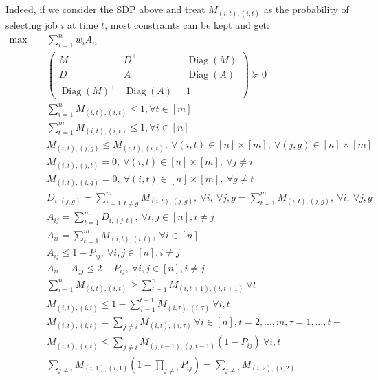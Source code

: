 \documentclass{article}
\newcommand{\Diag}{\operatorname{Diag}}
\begin{document}
Indeed, if we consider the SDP above and treat $M_{(i,t),(i,t)}$ as the probability of selecting job $i$ at time $t$, most constraints can be kept and get:
\begin{align*}
    \max\quad~&\sum_{i=1}^{n}w_iA_{ii}\\
    &\begin{pmatrix}
        M & D^\top &\Diag(M)\\
        D & A &\Diag(A)\\
        \Diag(M)^\top &\Diag(A)^\top &1
    \end{pmatrix}\succeq 0\\
    &\sum_{i=1}^{n}M_{(i,t),(i,t)} \leq 1,\forall t\in[m]\\
    &\sum_{t=1}^{m}M_{(i,t),(i,t)} \leq 1,\forall i\in[n]\\
    &M_{(i,t),(j,g)}\leq M_{(i,t),(i,t)},~\forall (i,t)\in [n]\times [m],~\forall (j,g)\in [n]\times [m]\\
    &M_{(i,t),(j,t)}=0,~\forall (i,t)\in [n]\times [m],~\forall j\neq i\\
    &M_{(i,t),(i,g)}=0,~\forall (i,t)\in [n]\times [m],~\forall g\neq t\\
    &D_{i,(j,g)} = \sum_{t=1,t\neq g}^{m}M_{(i,t),(j,g)},~\forall i,~\forall j,g = \sum_{t=1}^{m}M_{(i,t),(j,g)},~\forall i,~\forall j,g\\
    &A_{ij}=\sum_{t=1}^{m}D_{i,(j,t)},~\forall i,j\in [n], i\neq j\\
    &A_{ii}=\sum_{t=1}^{m}M_{(i,t),(i,t)},~\forall i\in[n]\\
    &A_{ij}\leq 1-P_{ij},~\forall i,j\in [n], i\neq j\\
    &A_{ii}+A_{jj}\leq 2-P_{ij},~\forall i,j\in [n], i\neq j\\
    &\sum_{i=1}^{n}M_{(i,t),(i,t)}\geq\sum_{i=1}^{n}M_{(i,t+1),(i,t+1)}~\forall t\\
    & M_{(i,t),(i,t)}\leq 1-\sum_{\tau = 1}^{t-1}M_{(i,\tau),(i,\tau)}~\forall i,t\\
    &M_{(i,t),(i,t)} = \sum_{j\neq i}M_{(i,t),(i,\tau)}~\forall i\in[n],t = 2,\ldots,m, \tau = 1,\ldots,t-\\
    &M_{(i,t),(i,t)}\leq \sum_{j\neq i}M_{(j,t-1),(j,t-1)}(1-P_{ij})~\forall i,t\\
    &\sum_{j\neq i}M_{(i,1),(i,1)}(1-\prod_{j\neq i}P_{ij}) = \sum_{j\neq i}M_{(i,2),(i,2)}
\end{align*}
\end{document}
